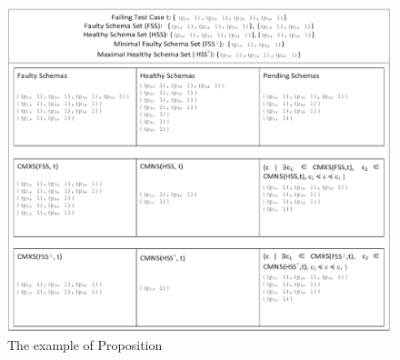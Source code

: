 {%

\begin{figure}[ht]
 \centering
 \includegraphics[width=5.6in]{minmax.pdf}
 \caption{The example of Proposition }
 \label{fig_minmax}
\end{figure}


%
%

}
